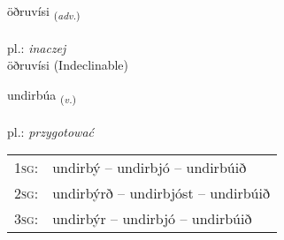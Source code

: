 \documentclass[frontgrid, backgrid]{flacards}\usepackage[]{graphicx}\usepackage[]{xcolor}
\begin{document}

\renewcommand{\flhead}{\vskip5pt \fboxsep=0pt {\small\bfseries\footnotesize Atviksorð | Adverb}}
\renewcommand{\fcfoot}{\vskip5pt \fboxsep=0pt \hspace{2pt}{\small\bfseries\footnotesize 2K}}

\renewcommand{\blhead}{\vskip5pt {\small\bfseries\footnotesize Atviksorð | Adverb }}
\renewcommand{\bcfoot}{\vskip5pt \hspace{2pt}{\small\bfseries\footnotesize 2K}}


{öðruvísi \small{\textsubscript{(\textit{adv.})}} \\[1ex]
\textphonetic{[œðrʏvisɪ]} \\
pl.: \emph{inaczej} \\  [2ex]
öðruvísi (Indeclinable)}

\renewcommand{\flhead}{\vskip5pt \fboxsep=0pt {\small\bfseries\footnotesize Sagnorð | Verb}}
\renewcommand{\fcfoot}{\vskip5pt \fboxsep=0pt \hspace{2pt}{\small\bfseries\footnotesize 2K}}

\renewcommand{\blhead}{\vskip5pt {\small\bfseries\footnotesize Sagnorð | Verb }}
\renewcommand{\bcfoot}{\vskip5pt \hspace{2pt}{\small\bfseries\footnotesize 2K}}


{undirbúa \small{\textsubscript{(\textit{v.})}} \\[1ex] %
 \\
pl.: \emph{przygotować} \\  [2ex]
\renewcommand*{\arraystretch}{0.8}
\begin{tabular}{p{1cm}l}
\textsc{1sg}: & undirbý -- undirbjó -- undirbúið \\ 
\textsc{2sg}: & undirbýrð -- undirbjóst -- undirbúið \\ 
\textsc{3sg}: & undirbýr -- undirbjó -- undirbúið \\ 
\end{tabular}
}
\end{document}
